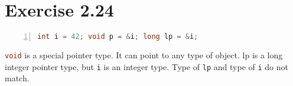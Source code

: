 \documentclass{article}
\begin{document}
\section*{Exercise 2.24}

\begin{lstlisting}[language=C++, numbers=left, xleftmargin=2em, basicstyle=\ttfamily]
int i = 42; void p = &i; long lp = &i;
\end{lstlisting}

\begin{flushleft}
\lstinline[language=C++]|void| is a special pointer type. It can point to any type of object. lp is a long integer pointer type, but \lstinline[language=C++]|i| is an integer type. Type of \lstinline[language=C++]|lp| and type of \lstinline[language=C++]|i| do not match.
\end{flushleft}
\end{document}
